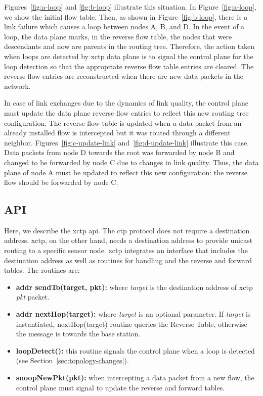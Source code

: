 Figures~\ref{fig:a-loop} and \ref{fig:b-loop} illustrate this situation. In Figure~\ref{fig:a-loop}, we show the initial flow table. Then, as shown in Figure~\ref{fig:b-loop}, there is a link failure which causes a loop between nodes A, B, and D. In the event of a loop, the data plane marks, in the reverse flow table, the nodes that were descendants and now are parents in the routing tree. Therefore, the action taken when loops are detected by \ac{xctp} data plane is to signal the control plane for the loop detection so that the appropriate reverse flow table entries are cleared. The reverse flow entries are reconstructed when there are new data packets in the network.

In case of link exchanges due to the dynamics of link quality, the control plane must update the data plane reverse flow entries to reflect this new routing tree configuration. The reverse flow table is updated when a data packet from an already installed flow is intercepted but it was routed through a different neighbor. Figures~\ref{fig:c-update-link} and~\ref{fig:d-update-link} illustrate this case. Data packets from node D towards the root was forwarded by node B and changed to be forwarded by node C due to changes in link quality. Thus, the data plane of node A must be updated to reflect this new configuration: the reverse flow should be forwarded by node C.

\subsection{API}
\label{sec:api}



Here, we describe the \ac{xctp} \ac{api}. The \ac{ctp} protocol does not require a destination address. \ac{xctp}, on the other hand, needs a destination address to provide unicast routing to a specific sensor node. \ac{xctp} integrates an interface that includes the destination address as well as routines for handling and the reverse and forward tables. The routines are:

\begin{itemize}
    \item \textbf{addr sendTo(target, pkt):} where \textit{target} is the destination address of \ac{xctp} \textit{pkt} packet.
    \item \textbf{addr nextHop(target):} where \textit{target} is an optional parameter. If \textit{target} is instantiated, nextHop(target) routine queries the Reverse Table, otherwise the message is towards the base station.
     \item \textbf{loopDetect():} this routine signals the control plane when a loop is detected (see Section~\ref{sec:topology-changes}).
     \item \textbf{snoopNewPkt(pkt):} when intercepting a data packet from a new flow, the control plane must signal to update the reverse and forward tables.
\end{itemize}

